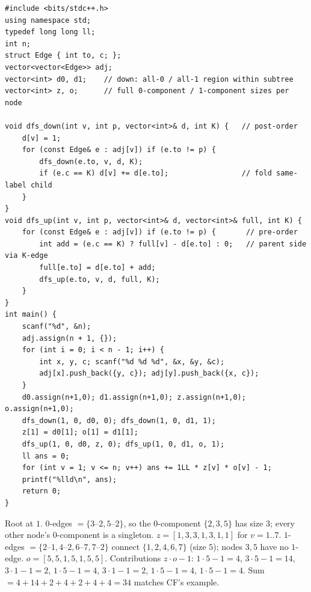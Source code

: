 \begin{lstlisting}[caption={Codeforces 1156D -- two invertible pair reroots (0- and 1-edges), then sum z[v]*o[v] - 1 over every transition vertex}, label={lst:c20-1156d-soln}]
#include <bits/stdc++.h>
using namespace std;
typedef long long ll;
int n;
struct Edge { int to, c; };
vector<vector<Edge>> adj;
vector<int> d0, d1;    // down: all-0 / all-1 region within subtree
vector<int> z, o;      // full 0-component / 1-component sizes per node

void dfs_down(int v, int p, vector<int>& d, int K) {   // post-order
    d[v] = 1;
    for (const Edge& e : adj[v]) if (e.to != p) {
        dfs_down(e.to, v, d, K);
        if (e.c == K) d[v] += d[e.to];                 // fold same-label child
    }
}
void dfs_up(int v, int p, vector<int>& d, vector<int>& full, int K) {
    for (const Edge& e : adj[v]) if (e.to != p) {       // pre-order
        int add = (e.c == K) ? full[v] - d[e.to] : 0;   // parent side via K-edge
        full[e.to] = d[e.to] + add;
        dfs_up(e.to, v, d, full, K);
    }
}
int main() {
    scanf("%d", &n);
    adj.assign(n + 1, {});
    for (int i = 0; i < n - 1; i++) {
        int x, y, c; scanf("%d %d %d", &x, &y, &c);
        adj[x].push_back({y, c}); adj[y].push_back({x, c});
    }
    d0.assign(n+1,0); d1.assign(n+1,0); z.assign(n+1,0); o.assign(n+1,0);
    dfs_down(1, 0, d0, 0); dfs_down(1, 0, d1, 1);
    z[1] = d0[1]; o[1] = d1[1];
    dfs_up(1, 0, d0, z, 0); dfs_up(1, 0, d1, o, 1);
    ll ans = 0;
    for (int v = 1; v <= n; v++) ans += 1LL * z[v] * o[v] - 1;
    printf("%lld\n", ans);
    return 0;
}
\end{lstlisting}

\begin{tracebox}[Official Example: $n=7$, edges $2\text{--}1{:}1,3\text{--}2{:}0,4\text{--}2{:}1,5\text{--}2{:}0,6\text{--}7{:}1,7\text{--}2{:}1$]
Root at $1$. $0$-edges $=\{3\text{--}2,5\text{--}2\}$, so the $0$-component
$\{2,3,5\}$ has size $3$; every other node's $0$-component is a singleton.
$z=[1,3,3,1,3,1,1]$ for $v=1..7$. $1$-edges $=\{2\text{--}1,4\text{--}2,
6\text{--}7,7\text{--}2\}$ connect $\{1,2,4,6,7\}$ (size $5$); nodes $3,5$ have
no $1$-edge. $o=[5,5,1,5,1,5,5]$. Contributions $z\!\cdot\!o-1$:
$1{\cdot}5{-}1{=}4$, $3{\cdot}5{-}1{=}14$, $3{\cdot}1{-}1{=}2$,
$1{\cdot}5{-}1{=}4$, $3{\cdot}1{-}1{=}2$, $1{\cdot}5{-}1{=}4$,
$1{\cdot}5{-}1{=}4$. Sum $=4{+}14{+}2{+}4{+}2{+}4{+}4=\boxed{34}$ \checkmark
matches CF's example.
\end{tracebox}

